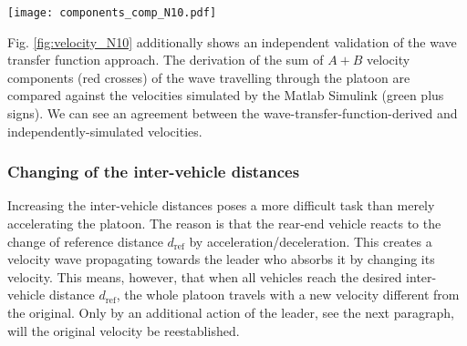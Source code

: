 \documentclass[final,5p,times,twocolumn]{elsarticle}
\begin{document}
\begin{figure*}[htb]\centering
\texttt{[image: components\_comp\_N10.pdf]}
  \caption{Simulation of the velocity wave propagating in the platoon with the Front-sided wave-absorbing controller at several time instances. At the beginning, $t=0\,{\text{s}}$, all platoon vehicles are standing still except for the leader which accelerates to a velocity $0.5\,\text{ms}^{-1}$. At intermediate times, the wave travels to the rear vehicle, where it is reflected and travels back to the leader to be completely absorbed. By propagating, it forces platoon vehicles to accelerate by another $0.5\,\text{ms}^{-1}$ to a velocity $1\,\text{ms}^{-1}$. At the final stage, $t=30\,{\text{s}}$, the leader is the last one reaching the velocity $1\,\text{ms}^{-1}$ and the whole platoon moves with $1\,\text{ms}^{-1}$. The red crosses represent the derivation of $A+B$ positional components computed by the wave transfer function approach, the green plus signs are the velocities simulated by the Matlab Simulink.}
  \label{fig:velocity_N10}
\end{figure*}

Fig. \ref{fig:velocity_N10} additionally shows an independent validation of the wave transfer function approach. The derivation of the sum of $A+B$ velocity components (red crosses) of the wave travelling through the platoon are compared against the velocities simulated by the Matlab Simulink (green plus signs). We can see an agreement between the wave-transfer-function-derived and independently-simulated velocities.

\subsubsection{Changing of the inter-vehicle distances}
\label{subsec:changing_distances}

Increasing the inter-vehicle distances poses a more difficult task than merely accelerating the platoon. The reason is that the rear-end vehicle reacts to the change of reference distance $d_{\text{ref}}$ by acceleration/deceleration. This creates a velocity wave propagating towards the leader who absorbs it by changing its velocity. This means, however, that when all vehicles reach the desired inter-vehicle distance $d_{\text{ref}}$, the whole platoon travels with a new velocity different from the original. Only by an additional action of the leader, see the next paragraph, will the original velocity be reestablished.
\end{document}
